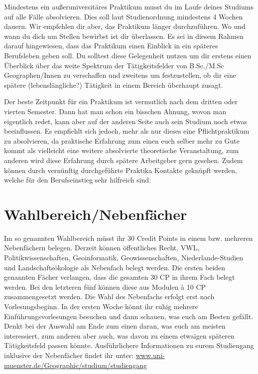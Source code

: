 \newpage

Mindestens ein außeruniversitäres Praktikum musst du im Laufe deines Studiums auf alle Fälle absolvieren. Dies soll laut Studienordnung mindestens 4 Wochen dauern. Wir empfehlen dir aber, das Praktikum länger durchzuführen. Wo und wann du dich um Stellen bewirbst ist dir überlassen. Es sei in diesem Rahmen darauf hingewiesen, dass das Praktikum einen Einblick in ein späteres Berufsleben geben soll. Du solltest diese Gelegenheit nutzen um dir erstens einen Überblick über das weite Spektrum der Tätigkeitsfelder von B.Sc./M.Sc Geographen/Innen zu verschaffen und zweitens um festzustellen, ob dir eine spätere (lebenslängliche?) Tätigkeit in einem Bereich überhaupt zusagt.

Der beste Zeitpunkt für ein Praktikum ist vermutlich nach dem dritten oder vierten Semester. Dann hat man schon ein bisschen Ahnung, wovon man eigentlich redet, kann aber auf der anderen Seite auch sein Studium noch etwas beeinﬂussen. Es empﬁehlt sich jedoch, mehr als nur dieses eine Pﬂichtpraktikum zu absolvieren, da praktische Erfahrung zum einen euch selber mehr zu Gute kommt als vielleicht eine weitere absolvierte theoretische Veranstaltung, zum anderen wird diese Erfahrung durch spätere Arbeitgeber gern gesehen. Zudem können durch vernünftig durchgeführte Praktika Kontakte geknüpft werden, welche für den Berufseinstieg sehr hilfreich sind.

\section*{Wahlbereich/Nebenfächer}
Im so genannten Wahlbereich müsst ihr 30 Credit Points in einem bzw. mehreren Nebenfächern belegen. Derzeit können öffentliches Recht, VWL, Politikwissenschaften, Geoinformatik, Geowissenschaften, Niederlande-Studien und Landschaftsökologie als Nebenfach belegt werden. Die ersten beiden genannten Fächer verlangen, dass die gesamten 30 CP in ihrem Fach belegt werden. Bei den letzteren fünf können diese aus Modulen à 10 CP zusammengesetzt werden. Die Wahl des Nebenfachs erfolgt erst nach Vorlesungsbeginn. In der ersten Woche könnt ihr ruhig mehrere Einführungsvorlesungen besuchen und dann schauen, was euch am Besten gefällt. Denkt bei der Auswahl am Ende zum einen daran, was euch am meisten interessiert, zum anderen aber auch, was davon zu einem etwaigen späteren Tätigkeitsfeld passen könnte. Ausführlichere Informationen zu eurem Studiengang inklusive der Nebenfächer ﬁndet ihr unter: \url{www.uni-muenster.de/Geographie/studium/studiengang}

